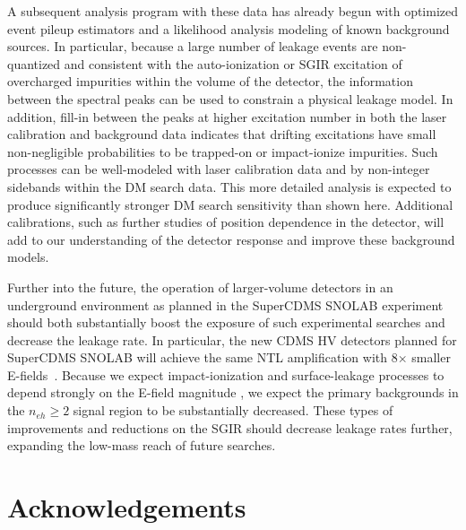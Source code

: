 \documentclass[%
reprint,
superscriptaddress,
preprintnumbers,
amsmath,amssymb,
prl,
aps,
floatfix
]{revtex4-1}
\begin{document}
A subsequent analysis program with these data has already begun with optimized event pileup estimators and a likelihood analysis modeling of known background sources. In particular, because a large number of leakage events are non-quantized and consistent with the auto-ionization or SGIR excitation of overcharged impurities within the volume of the detector, the information between the spectral peaks can be used to constrain a physical leakage model. In addition, fill-in between the peaks at higher excitation number in both the laser calibration and background data indicates that drifting excitations have small non-negligible probabilities to be trapped-on or impact-ionize impurities. Such processes can be well-modeled with laser calibration data and by non-integer sidebands within the DM search data. This more detailed analysis is expected to produce significantly stronger DM search sensitivity than shown here. Additional calibrations, such as further studies of position dependence in the detector, will add to our understanding of the detector response and improve these background models.

Further into the future, the operation of larger-volume detectors in an underground environment as planned in the SuperCDMS SNOLAB experiment~\cite{Agnese_PRD17_SuperCDMSSensitivity} should both substantially boost the exposure of such experimental searches and decrease the leakage rate.  In particular, the new CDMS HV detectors planned for SuperCDMS SNOLAB will achieve the same NTL amplification with 8$\times$ smaller E-fields~\cite{kurinsky,Agnese_PRD17_SuperCDMSSensitivity}. Because we expect impact-ionization and surface-leakage processes to depend strongly on the E-field magnitude \cite{phipps}, we expect the primary backgrounds in the $n_{eh}\geq 2$ signal region to be substantially decreased. These types of improvements and reductions on the SGIR should decrease leakage rates further, expanding the low-mass reach of future searches. 

\section{Acknowledgements}
\end{document}
